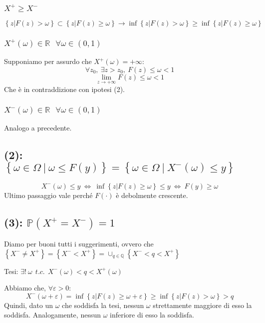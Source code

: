 \documentclass{article}
\begin{document}
\subsubsection{$X^+ \geq X^-$}
\[
	\left\{z| F(z)>\omega \right\} \subset \left\{z| F(z) \geq \omega\right\} \longrightarrow \inf \left\{z| F(z)>\omega \right\} \geq \inf \left\{z| F(z) \geq \omega\right\} 
\]

\subsubsection{$X^+(\omega) \in \mathbb{R} \ \ \  \forall \omega\in \left(0,1\right)$}
Supponiamo per assurdo che $X^+ (\omega) = +\infty$:
\[
	\forall z_0, \ \exists z>z_0, \ F(z) \leq \omega < 1
\]
\[
	\lim_{z\rightarrow +\infty} F(z) \leq \omega < 1	
\]
Che è in contraddizione con ipotesi (2).
\subsubsection{$X^-(\omega) \in \mathbb{R} \ \ \  \forall \omega\in \left(0,1\right)$}
Analogo a precedente.


\subsection{(2): $\left\{\omega \in \Omega \  |\  \omega \leq F(y)\right\} = \left\{\omega \in \Omega \  |\  X^-(\omega ) \leq  y\right\}$}
\[
	X^-(\omega) \leq y \  \Longleftrightarrow  \  \inf \left\{z| F(z) \geq \omega\right\} \leq y \  \Longleftrightarrow  \  F(y) \geq \omega
\]
Ultimo passaggio vale perché $F(\cdot)$ è debolmente crescente.

\subsection{(3): $\mathbb{P}(X^+ = X^-) = 1$}
Diamo per buoni tutti i suggerimenti, ovvero che $\left\{X^- \neq  X^+\right\} = \left\{X^- < X^+\right\} = \cup _{q\in \mathbb{Q}}\left\{X^- < q <X^+\right\}$

Tesi: $\exists!\  \omega \ \ t.c. \ \ X^-(\omega) < q < X^+(\omega)$

Abbiamo che, $\forall \varepsilon > 0$:
\[
	X^-(\omega+\varepsilon) = \inf \left\{z| F(z) \geq \omega+\varepsilon\right\} \geq \inf \left\{z| F(z) > \omega\right\} > q
\]
Quindi, dato un $\omega$ che soddisfa la tesi, nessun $\omega$ strettamente maggiore di esso la soddisfa. Analogamente, nessun $\omega$ inferiore di esso la soddisfa.
\end{document}
